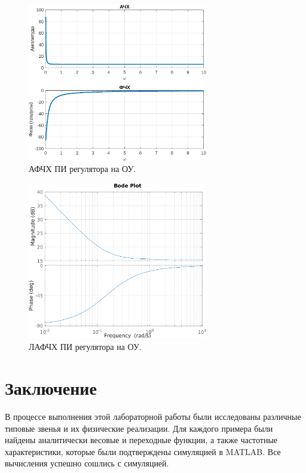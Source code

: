 \begin{figure}[H]
    \centering
    \includegraphics[width=0.7\textwidth]{figs/task_5_АФЧХ.png}
    \caption{АФЧХ ПИ регулятора на ОУ.}
    \label{fig:task_5_АФЧХ}
\end{figure}

\begin{figure}[H]
    \centering
    \includegraphics[width=0.7\textwidth]{figs/task_5_ЛАФЧХ.png}
    \caption{ЛАФЧХ ПИ регулятора на ОУ.}
    \label{fig:task_5_ЛАФЧХ}
\end{figure}


\section{Заключение}

В процессе выполнения этой лабораторной работы были исследованы различные
типовые звенья и их физические реализации. Для каждого примера были найдены
аналитически весовые и переходные функции, а также частотные характеристики,
которые были подтверждены симуляцией в MATLAB. Все вычисления успешно
сошлись с симуляцией.
